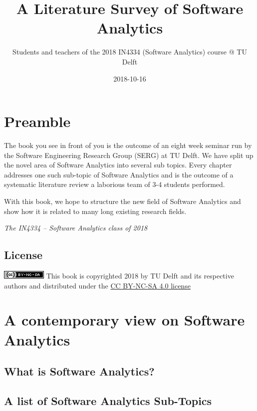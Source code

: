\documentclass[]{book}
\title{A Literature Survey of Software Analytics}
\author{Students and teachers of the 2018 IN4334 (Software Analytics) course @
TU Delft}
\date{2018-10-16}
\begin{document}
\maketitle

{
\hypersetup{linkcolor=black}
\setcounter{tocdepth}{1}
\tableofcontents
}
\chapter{Preamble}\label{intro}

The book you see in front of you is the outcome of an eight week seminar
run by the Software Engineering Research Group (SERG) at TU Delft. We
have split up the novel area of Software Analytics into several sub
topics. Every chapter addresses one such sub-topic of Software Analytics
and is the outcome of a systematic literature review a laborious team of
3-4 students performed.

With this book, we hope to structure the new field of Software Analytics
and show how it is related to many long existing research fields.

\emph{The IN4334 -- Software Analytics class of 2018}

\section{License}\label{license}

\includegraphics{figures/cc-nc-sa.png} This book is copyrighted 2018 by
TU Delft and its respective authors and distributed under the
\href{https://creativecommons.org/licenses/by-nc-sa/4.0/}{CC BY-NC-SA
4.0 license}

\chapter{A contemporary view on Software
Analytics}\label{a-contemporary-view-on-software-analytics}

\section{What is Software Analytics?}\label{what-is-software-analytics}

\section{A list of Software Analytics
Sub-Topics}\label{a-list-of-software-analytics-sub-topics}
\end{document}
